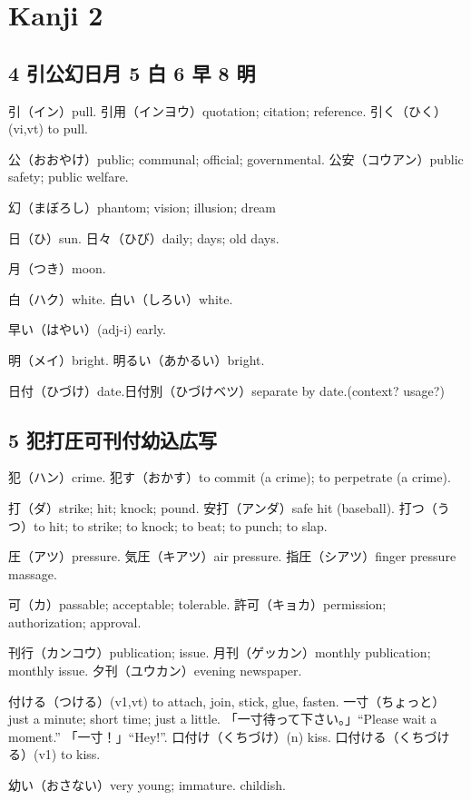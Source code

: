 \chapter{Kanji 2}

\section{4 引公幻日月 5 白 6 早 8 明}

引（イン）pull.
引用（インヨウ）quotation; citation; reference.
引く（ひく）(vi,vt) to pull.

公（おおやけ）public; communal; official; governmental.
公安（コウアン）public safety; public welfare.

幻（まぼろし）phantom; vision; illusion; dream

日（ひ）sun.
日々（ひび）daily; days; old days.

月（つき）moon.

白（ハク）white.
白い（しろい）white.

早い（はやい）(adj-i) early.

明（メイ）bright.
明るい（あかるい）bright.

日付（ひづけ）date.日付別（ひづけベツ）separate by date.(context? usage?)

\section{5 犯打圧可刊付幼込広写}

犯（ハン）crime.
犯す（おかす）to commit (a crime); to perpetrate (a crime).

打（ダ）strike; hit; knock; pound.
安打（アンダ）safe hit (baseball).
打つ（うつ）to hit; to strike; to knock; to beat; to punch; to slap.

圧（アツ）pressure.
気圧（キアツ）air pressure.
指圧（シアツ）finger pressure massage.

可（カ）passable; acceptable; tolerable.
許可（キョカ）permission; authorization; approval.

刊行（カンコウ）publication; issue.
月刊（ゲッカン）monthly publication; monthly issue.
夕刊（ユウカン）evening newspaper.

付ける（つける）(v1,vt) to attach, join, stick, glue, fasten.
一寸（ちょっと）just a minute; short time; just a little.
「一寸待って下さい。」``Please wait a moment.''
「一寸！」``Hey!''.
口付け（くちづけ）(n) kiss.
口付ける（くちづける）(v1) to kiss.

幼い（おさない）very young; immature. childish.

